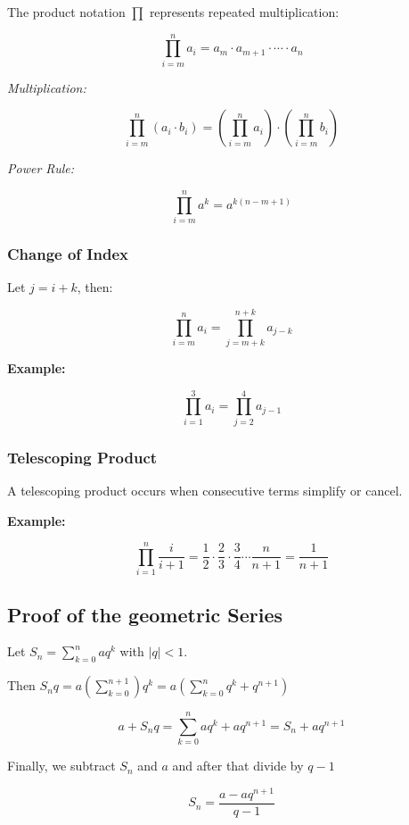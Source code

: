 The product notation \(\prod\) represents repeated multiplication:

\[
    \prod_{i = m}^{n} a_i = a_m \cdot a_{m+1} \cdot \cdots \cdot a_n
\]

\emph{Multiplication:}
    
\[
    \prod_{i = m}^{n} (a_i \cdot b_i) = \left( \prod_{i = m}^{n} a_i \right) \cdot \left( 
    \prod_{i = m}^{n} b_i \right)
\]

\emph{Power Rule:}
    
\[
    \prod_{i = m}^{n} a^k = a^{k(n - m + 1)}
\]

\subsubsection{Change of Index}

Let \(j = i + k\), then:

\[
    \prod_{i = m}^{n} a_i = \prod_{j = m + k}^{n + k} a_{j - k}
\]

\textbf{Example:}

\[
    \prod_{i = 1}^{3} a_i = \prod_{j = 2}^{4} a_{j - 1}
\]

\subsubsection{Telescoping Product}

A telescoping product occurs when consecutive terms simplify or cancel.

\textbf{Example:}

\[
    \prod_{i = 1}^{n} \frac{i}{i+1} = \frac{1}{2} \cdot \frac{2}{3} \cdot \frac{3}{4} \cdots 
    \frac{n}{n+1} = \frac{1}{n+1}
\]

\subsection{Proof of the geometric Series}

Let \(S_n = \sum_{k = 0}^{n}aq^k\) with \(|q| < 1\).

Then \(S_n q = a(\sum_{k = 0}^{n + 1})q^k = a\left( \sum_{k= 0}^{n} q^k + q^{n + 1}\right)\)

\[
    a + S_n q = \sum_{k = 0}^{n}aq^k + aq^{n + 1}  = S_n + aq^{n + 1}
\]

Finally, we subtract \(S_n\) and \(a\) and after that divide by \(q - 1\)

\[
    S_n = \frac{a - aq^{n + 1}}{q - 1}
\]

\QED